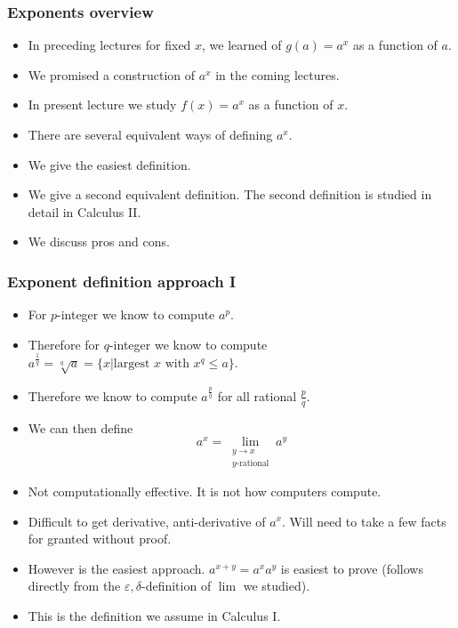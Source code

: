 \begin{frame}
\frametitle{Exponents overview}
\begin{itemize}
\item<1-> In preceding lectures for fixed $x$, we learned of $g(a) =a^{x}$ as a function of $a$.
\item<2-> We promised a construction of $a^x$ in the coming lectures.
\item<3-> In present lecture we study $f(x)=a^x$ as a function of $x$.
\item<4-> There are several equivalent ways of defining $a^x$. 
\item<5-> We give the easiest definition. 
\item<6->We give a second equivalent definition. The second definition is studied in detail in Calculus II. 
\item<7->We discuss pros and cons.
\end{itemize}
\end{frame}
\begin{frame}
\frametitle{Exponent definition approach I}
\begin{itemize}
\item<1-> For $p$-integer we know to compute $a^p$.
\item<2-> Therefore for $q$-integer we know to compute $a^{\frac{1}{q}}= \sqrt[q]{a}=\{x|\text{largest~}x\text{~with~} x^q\leq a\}$.
\item<3-> Therefore we know to compute $a^{\frac{p}{q}}$ for all rational $\frac{p}{q}$.
\item<4-> We can then define
\[
a^x = \lim\limits_{\substack{y \to x \\ y\text{-rational}}} a^y 
\]
\item<5-> Not computationally effective. It is not how computers compute.
\item<6-> Difficult to get derivative, anti-derivative of $a^x$. Will need to take a few facts for granted without proof.
\item<7-> However is the easiest approach. $a^{x+y}=a^xa^y$ is easiest to prove (follows directly from the $\varepsilon, \delta$-definition of $\lim$ we studied).
\item<8->\alert<8->{This is the definition we assume in Calculus I.}
\end{itemize}
\end{frame}

